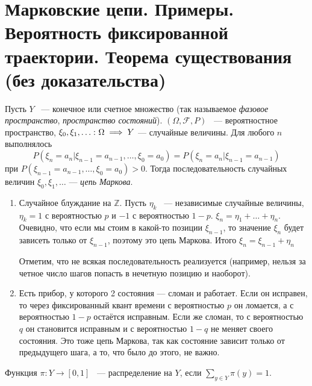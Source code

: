 \section{Марковские цепи. Примеры. Вероятность фиксированной траектории. Теорема существования (без доказательства)}

\begin{definition}
    Пусть $Y$ ~--- конечное или счетное множество (так называемое \textit{фазовое пространство}, \textit{пространство состояний}).
    $(\Omega, \mathcal{F}, P)$ ~--- вероятностное пространство, $\xi_0, \xi_1, \ldots \colon \Omega \implies Y$ --- случайные величины.
Для любого $n$ выполнялось 
$$P(\xi_n = a_n | \xi_{n-1} = a_{n - 1}, \ldots, \xi_0 = a_0 ) = P(\xi_n = a_n | \xi_{n- 1} = a_{n - 1})$$
при $P(\xi_{n - 1} = a_{n-1}, \ldots, \xi_0 = a_0) > 0$.
Тогда последовательность случайных величин $\xi_0, \xi_1,  \ldots$ --- \textit{цепь Маркова}.
\end{definition}
\begin{examples}
\enewline
    \begin{enumerate}
        \item Случайное блуждание на $\mathbb{Z}$.
              Пусть $\eta_k$ ~--- независимые случайные величины, $\eta_k = 1$ с вероятностью $p$ и $-1$ с вероятностью $1-p$. $\xi_n = \eta_1 + \ldots + \eta_n$.
              Очевидно, что если мы стоим в какой-то позиции $\xi_{n - 1}$, то значение $\xi_n$ будет зависеть только от $\xi_{n - 1}$,
              поэтому это цепь Маркова. Итого $\xi_n = \xi_{n - 1} + \eta_n$

              Отметим, что не всякая последовательность реализуется (например, нельзя за четное число шагов попасть в нечетную позицию и наоборот).

        \item Есть прибор, у которого 2 состояния --- сломан и работает. Если он исправен, то через фиксированный квант времени с вероятностью $p$ он ломается, а с вероятностью $1-p$ остаётся исправным. Если же сломан, то с вероятностью $q$ он становится исправным и с вероятностью $1-q$ не меняет своего состояния.
              Это тоже цепь Маркова, так как состояние зависит только от предыдущего шага, а то, что было до этого, не важно.
    \end{enumerate}
\end{examples}

 \begin{definition}
    Функция $\pi\colon Y \to [0, 1]$ ~--- распределение на $Y$, если  $\sum_{y\in Y} \pi(y) = 1$.
\end{definition}

